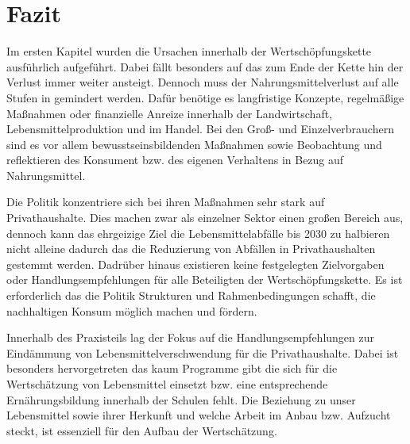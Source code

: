 \newpage
\section{Fazit}

Im ersten Kapitel wurden die Ursachen innerhalb der Wertschöpfungskette ausführlich aufgeführt. Dabei fällt besonders auf das zum Ende der Kette hin der Verlust immer weiter ansteigt. Dennoch muss der Nahrungsmittelverlust auf alle Stufen in gemindert werden. Dafür benötige es langfristige Konzepte, regelmäßige Maßnahmen oder finanzielle Anreize innerhalb der Landwirtschaft, Lebensmittelproduktion und im Handel. Bei den Groß- und Einzelverbrauchern sind es vor allem bewusstseinsbildenden Maßnahmen sowie Beobachtung und reflektieren des Konsument bzw. des eigenen Verhaltens in Bezug auf Nahrungsmittel.

Die Politik konzentriere sich bei ihren Maßnahmen sehr stark auf Privathaushalte. Dies machen zwar als einzelner Sektor einen großen Bereich aus, dennoch kann das ehrgeizige Ziel die Lebensmittelabfälle bis 2030 zu halbieren nicht alleine dadurch das die Reduzierung von Abfällen in Privathaushalten gestemmt werden. Dadrüber hinaus existieren keine festgelegten Zielvorgaben oder Handlungsempfehlungen für alle Beteiligten der Wertschöpfungskette. Es ist erforderlich das die Politik Strukturen und Rahmenbedingungen schafft, die nachhaltigen Konsum möglich machen und fördern.

Innerhalb des Praxisteils lag der Fokus auf die Handlungsempfehlungen zur Eindämmung von Lebensmittelverschwendung für die Privathaushalte. Dabei ist besonders hervorgetreten das kaum Programme gibt die sich für die Wertschätzung von Lebensmittel einsetzt bzw. eine entsprechende Ernährungsbildung innerhalb der Schulen fehlt. Die Beziehung zu unser Lebensmittel sowie ihrer Herkunft und welche Arbeit im Anbau bzw. Aufzucht steckt, ist essenziell für den Aufbau der Wertschätzung.